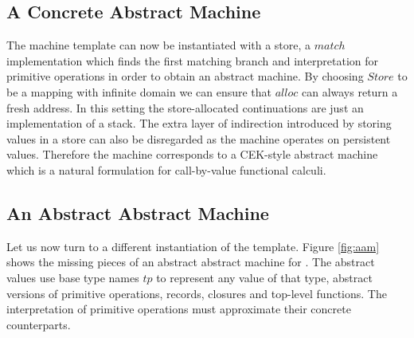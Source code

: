 \subsection*{A Concrete Abstract Machine}
The machine template can now be instantiated with a store, a $\mathit{match}$ implementation which finds the first matching branch and interpretation for primitive operations in order to obtain an abstract machine.
By choosing $\mathit{Store}$ to be a mapping with infinite domain we can ensure that $\mathit{alloc}$ can always return a fresh address.
In this setting the store-allocated continuations are just an implementation of a stack.
The extra layer of indirection introduced by storing values in a store can also be disregarded as the machine operates on persistent values.
Therefore the machine corresponds to a CEK-style abstract machine which is a natural \cite{functional-correspondence} formulation for call-by-value functional calculi.

\subsection*{An Abstract Abstract Machine}\label{ss:aam}
Let us now turn to a different instantiation of the template.
Figure \ref{fig:aam} shows the missing pieces of an abstract abstract machine for \IDL{}.
The abstract values use base type names $tp$ to represent any value of that type, abstract versions of primitive operations, records, closures and top-level functions.
The interpretation of primitive operations must approximate their concrete counterparts.

